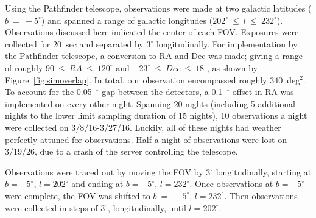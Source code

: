 \documentclass[aps,prb,twocolumn,superscriptaddress]{revtex4-1}
\begin{document}
Using the Pathfinder telescope, observations were made at two galactic latitudes ($b~=~\pm5^{\circ}$) and spanned a range of galactic longitudes ($202^{\circ}~\leq~l~\leq~232^{\circ}$).  Observations discussed here indicated the center of each FOV.  
Exposures were collected for $20$~sec and separated by $3^{\circ}$ longitudinally.  For implementation by the Pathfinder telescope, a conversion to RA and Dec was made; giving a range of roughly $90~\leq~RA~\leq~120^{\circ}$ and $-23^{\circ}~\leq~Dec~\leq~18^{\circ}$, as shown by Figure~\ref{fig:simoverlap}.  In total, our observation encompassed roughly $340$~deg$^{2}$.  To account for the 0.05~$^{\circ}$ gap between the detectors, a 0.1~$^{\circ}$ offset in RA was implemented on every other night.  
Spanning 20 nights (including 5 additional nights to the lower limit sampling duration of 15 nights), 10 observations a night were collected on 3/8/16-3/27/16.  Luckily, all of these nights had weather perfectly attuned for observations.  Half a night of observations were lost on 3/19/26, due to a crash of the server controlling the telescope.


Observations were traced out by moving the FOV by $3^{\circ}$ longitudinally, starting at $b=-5^{\circ}$, $l=202^{\circ}$ and ending at $b=-5^{\circ}$, $l=232^{\circ}$.  Once observations at $b=-5^{\circ}$ were complete, the FOV was shifted to $b~=~+5^{\circ}$, $l=232^{\circ}$. Then observations were collected in steps of $3^{\circ}$, longitudinally, until $l=202^{\circ}$. 


\end{document}
